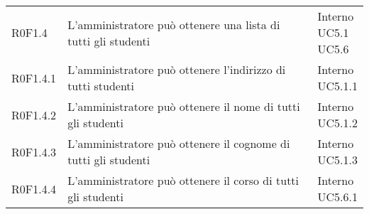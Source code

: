\documentclass[AnalisiDeiRequisiti.tex]{subfiles}
\begin{document}
\begin{longtable}[H]{p{2cm}p{5.2cm}p{5cm}}
	R0F1.4 & L'amministratore può ottenere una lista di tutti gli studenti & \makecell[tl]{
		Interno \\
		UC5.1 \\
		UC5.6
	} \\
	R0F1.4.1 & L'amministratore può ottenere l'indirizzo di tutti studenti & \makecell[tl]{
		Interno \\
		UC5.1.1
	} \\
	R0F1.4.2 & L'amministratore può ottenere il nome di tutti gli studenti & \makecell[tl]{
		Interno \\
		UC5.1.2
	} \\
	R0F1.4.3 & L'amministratore può ottenere il cognome di tutti gli studenti & \makecell[tl]{
		Interno \\
		UC5.1.3
	} \\
	R0F1.4.4  & L'amministratore può ottenere il corso di tutti gli studenti & \makecell[tl]{
		Interno \\
		UC5.6.1
	} \\


\end{longtable}
\end{document}
